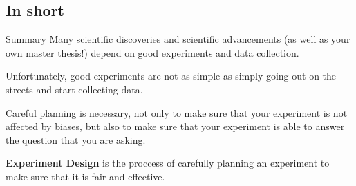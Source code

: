 \subsection{In short}
\begin{frame}{Summary}
  Many scientific discoveries and scientific advancements (as well as your own master thesis!) depend on good experiments and data collection.\bigskip

  Unfortunately, good experiments are not as simple as simply going out on the streets and start collecting data.\bigskip

  Careful planning is necessary, not only to make sure that your experiment is not affected by biases, but also to make sure that your experiment is able to answer the question that you are asking.\bigskip

  {\bf Experiment Design} is the proccess of carefully planning an experiment to make sure that it is fair and effective.
\end{frame}
